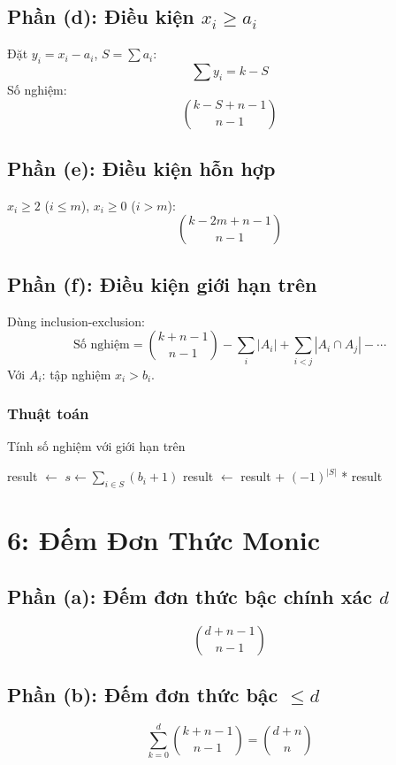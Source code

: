 \documentclass[a4paper,12pt]{article}
\theoremstyle{plain}
\theoremstyle{definition}
\begin{document}
\subsection*{Phần (d): Điều kiện \( x_i \geq a_i \)}
Đặt \( y_i = x_i - a_i \), \( S = \sum a_i \):
\[
\sum y_i = k - S
\]
Số nghiệm:
\[
\binom{k-S+n-1}{n-1}
\]

\subsection*{Phần (e): Điều kiện hỗn hợp}
\( x_i \geq 2 \) (\( i \leq m \)), \( x_i \geq 0 \) (\( i > m \)):
\[
\binom{k-2m+n-1}{n-1}
\]

\subsection*{Phần (f): Điều kiện giới hạn trên}
Dùng inclusion-exclusion:
\[
\text{Số nghiệm} = \binom{k+n-1}{n-1} - \sum_i |A_i| + \sum_{i<j} |A_i \cap A_j| - \cdots
\]
Với \( A_i \): tập nghiệm \( x_i > b_i \).

\subsubsection*{Thuật toán}
\begin{algorithm}
\caption{Tính số nghiệm với giới hạn trên}
\begin{algorithmic}
    \State result $\gets$ 
        \State $s \gets \sum_{i \in S} (b_i + 1)$
        \State result $\gets$ result + $(-1)^{|S|}$ * 
    \EndFor
    \State \Return result
\EndFunction
\end{algorithmic}
\end{algorithm}

\section*{6: Đếm Đơn Thức Monic}

\subsection*{Phần (a): Đếm đơn thức bậc chính xác \( d \)}
\[
\binom{d+n-1}{n-1}
\]

\subsection*{Phần (b): Đếm đơn thức bậc \( \leq d \)}
\[
\sum_{k=0}^d \binom{k+n-1}{n-1} = \binom{d+n}{n}
\]
\end{document}
